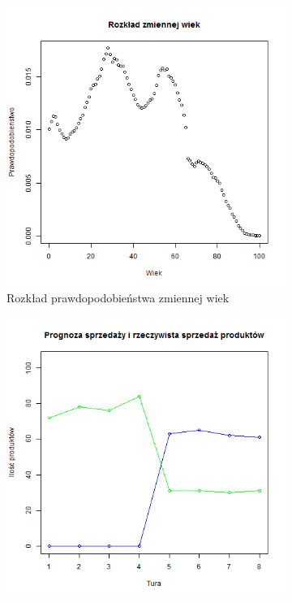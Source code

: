 \documentclass[polish, twoside, 12pt, a4paper]{article}
\theoremstyle{definition}
\theoremstyle{plain}
\theoremstyle{remark}
\begin{document}
\begin{figure}[hbt]
  \centering
  \begin{subfigure}[t]{0.45\textwidth}
    \includegraphics[width=\textwidth]{pictures/wiek.png}
    \caption{Rozkład prawdopodobieństwa zmiennej wiek}
    \label{fig:wiek}
  \end{subfigure}
  \hfill
  \begin{subfigure}[t]{0.45\textwidth}
    \includegraphics[width=\textwidth]{pictures/wyksztalcenie.png}

\end{subfigure}
\end{figure}
\end{document}
